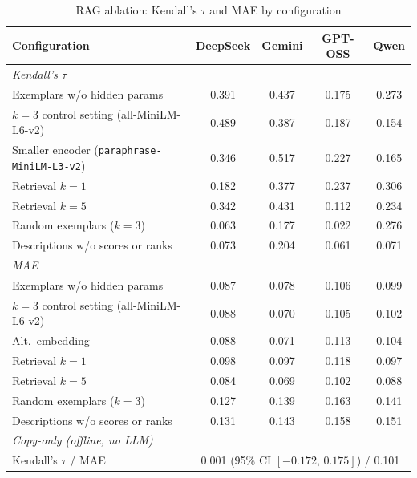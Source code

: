\documentclass[11pt]{article}
\begin{document}
\begin{table}[htbp]
\centering
\small
\centering
\caption{RAG ablation: Kendall's $\tau$ and MAE by configuration}
\label{tab:rag_ablation_full}
\renewcommand{\arraystretch}{1.15}
\begin{tabular}{lcccc}
\toprule
Configuration & DeepSeek & Gemini & GPT-OSS & Qwen \\
\midrule
\multicolumn{5}{l}{\emph{Kendall's $\tau$}} \\
Exemplars w/o hidden params & 0.391 & 0.437 & 0.175 & 0.273 \\
$k{=}3$ control setting (all-MiniLM-L6-v2) & 0.489 & 0.387 & 0.187 & 0.154 \\
Smaller encoder (\texttt{paraphrase-MiniLM-L3-v2}) & 0.346 & 0.517 & 0.227 & 0.165 \\
Retrieval $k=1$ & 0.182 & 0.377 & 0.237 & 0.306 \\
Retrieval $k=5$ & 0.342 & 0.431 & 0.112 & 0.234 \\
Random exemplars ($k=3$) & 0.063 & 0.177 & 0.022 & 0.276 \\
Descriptions w/o scores or ranks & 0.073 & 0.204 & 0.061 & 0.071 \\
\midrule
\multicolumn{5}{l}{\emph{MAE}} \\
Exemplars w/o hidden params & 0.087 & 0.078 & 0.106 & 0.099 \\
$k{=}3$ control setting (all-MiniLM-L6-v2) & 0.088 & 0.070 & 0.105 & 0.102 \\
Alt.\ embedding & 0.088 & 0.071 & 0.113 & 0.104 \\
Retrieval $k=1$ & 0.098 & 0.097 & 0.118 & 0.097 \\
Retrieval $k=5$ & 0.084 & 0.069 & 0.102 & 0.088 \\
Random exemplars ($k=3$) & 0.127 & 0.139 & 0.163 & 0.141 \\
Descriptions w/o scores or ranks & 0.131 & 0.143 & 0.158 & 0.151 \\
\midrule
\multicolumn{5}{l}{\emph{Copy-only (offline, no LLM)}} \\
Kendall's $\tau$ / MAE & \multicolumn{4}{c}{0.001 (95\% CI $[-0.172,\, 0.175]$) / 0.101} \\
\bottomrule
\end{tabular}
\renewcommand{\arraystretch}{1.0}
\end{table}
\end{document}
